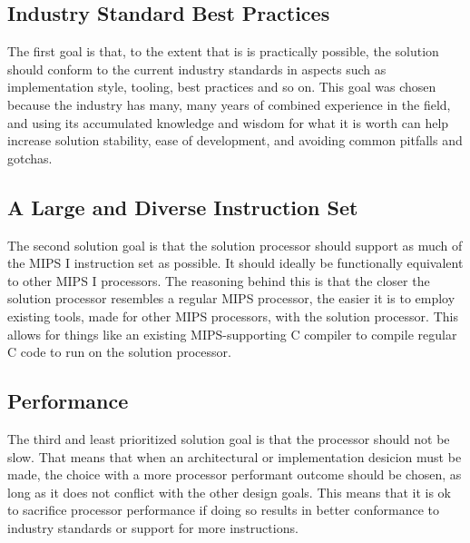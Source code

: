 \subsection{Industry Standard Best Practices}

The first goal is that, to the extent that is is practically possible, the solution should conform to the current industry standards in aspects such as implementation style, tooling, best practices and so on.
This goal was chosen because the industry has many, many years of combined experience in the field, and using its accumulated knowledge and wisdom for what it is worth can help increase solution stability, ease of development, and avoiding common pitfalls and gotchas.

\subsection{A Large and Diverse Instruction Set}

The second solution goal is that the solution processor should support as much of the MIPS I instruction set as possible.
It should ideally be functionally equivalent to other MIPS I processors.
The reasoning behind this is that the closer the solution processor resembles a regular MIPS processor, the easier it is to employ existing tools, made for other MIPS processors, with the solution processor.
This allows for things like an existing MIPS-supporting C compiler to compile regular C code to run on the solution processor.

\subsection{Performance}

The third and least prioritized solution goal is that the processor should not be slow.
That means that when an architectural or implementation desicion must be made, the choice with a more processor performant outcome should be chosen, as long as it does not conflict with the other design goals.
This means that it is ok to sacrifice processor performance if doing so results in better conformance to industry standards or support for more instructions.

